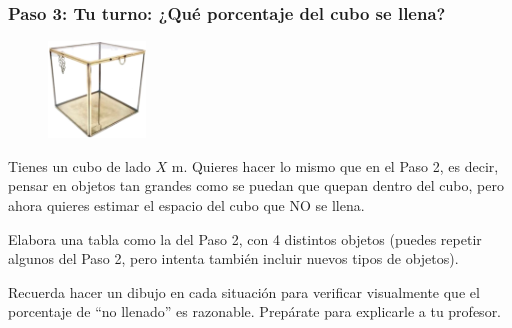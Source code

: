 \documentclass[12pt,a4paper]{article}
\begin{document}
\vspace{5mm}


\subsubsection*{Paso 3: Tu turno: ¿Qué porcentaje del cubo se llena?}

\begin{figure}
\centering
\vspace{-5pt}
\includegraphics[width=0.23\textwidth]{Figuras/fig35.png}
\vspace{-5pt}
\end{figure}

Tienes un cubo de lado $X$ m. Quieres hacer lo mismo que en el Paso 2, es decir, pensar en objetos tan grandes como se puedan que quepan dentro del cubo, pero ahora quieres estimar el espacio del cubo que NO se llena.

Elabora una tabla como la del Paso 2, con 4 distintos objetos (puedes repetir algunos del Paso 2, pero intenta también incluir nuevos tipos de objetos).

Recuerda hacer un dibujo en cada situación para verificar visualmente que el porcentaje de ``no llenado'' es razonable. Prepárate para explicarle a tu profesor.
\end{document}
